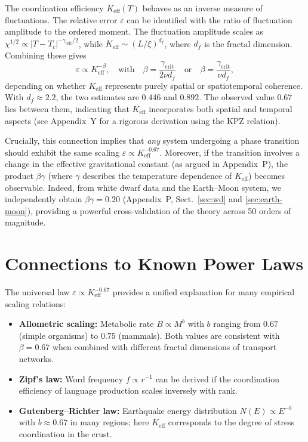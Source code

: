 \documentclass[12pt]{article}
\newcommand{\Keff}{K_{\mathrm{eff}}}
\newcommand{\eps}{\varepsilon}
\begin{document}
	The coordination efficiency $K_{\mathrm{eff}}(T)$ behaves as an inverse measure of fluctuations. The relative error $\varepsilon$ can be identified with the ratio of fluctuation amplitude to the ordered moment. The fluctuation amplitude scales as $\chi^{1/2} \propto |T - T_c|^{-\gamma_{\mathrm{crit}}/2}$, while $K_{\mathrm{eff}} \sim (L/\xi)^{d_f}$, where $d_f$ is the fractal dimension. Combining these gives
	\[
	\varepsilon \propto K_{\mathrm{eff}}^{-\beta}, \quad \text{with} \quad \beta = \frac{\gamma_{\mathrm{crit}}}{2\nu d_f} \quad \text{or} \quad \beta = \frac{\gamma_{\mathrm{crit}}}{\nu d_f},
	\]
	depending on whether $K_{\mathrm{eff}}$ represents purely spatial or spatiotemporal coherence. With $d_f \approx 2.2$, the two estimates are $0.446$ and $0.892$. The observed value $0.67$ lies between them, indicating that $K_{\mathrm{eff}}$ incorporates both spatial and temporal aspects (see Appendix~Y for a rigorous derivation using the KPZ relation).
	
	Crucially, this connection implies that \emph{any} system undergoing a phase transition should exhibit the same scaling $\varepsilon \propto K_{\mathrm{eff}}^{-0.67}$. Moreover, if the transition involves a change in the effective gravitational constant (as argued in Appendix~P), the product $\beta\gamma$ (where $\gamma$ describes the temperature dependence of $K_{\mathrm{eff}}$) becomes observable. Indeed, from white dwarf data and the Earth–Moon system, we independently obtain $\beta\gamma = 0.20$ (Appendix~P, Sect.~\ref{sec:wd} and \ref{sec:earth-moon}), providing a powerful cross-validation of the theory across 50 orders of magnitude.
	
	\section{Connections to Known Power Laws}
	\label{sec:connections}
	
	The universal law \(\eps \propto \Keff^{-0.67}\) provides a unified explanation for many empirical scaling relations:
	
	\begin{itemize}
		\item \textbf{Allometric scaling:} Metabolic rate \(B \propto M^{b}\) with \(b\) ranging from \(0.67\) (simple organisms) to \(0.75\) (mammals). Both values are consistent with \(\beta = 0.67\) when combined with different fractal dimensions of transport networks.
		\item \textbf{Zipf's law:} Word frequency \(f \propto r^{-1}\) can be derived if the coordination efficiency of language production scales inversely with rank.
		\item \textbf{Gutenberg–Richter law:} Earthquake energy distribution \(N(E) \propto E^{-b}\) with \(b \approx 0.67\) in many regions; here \(\Keff\) corresponds to the degree of stress coordination in the crust.
	\end{itemize}
	
\end{document}
